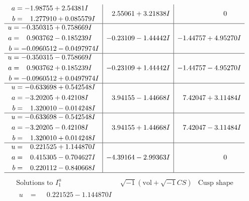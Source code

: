 \documentclass[1p]{elsarticle_modified}
\theoremstyle{definition}
\newcommand{\I}{\sqrt{-1}}
\begin{document}
$$\begin{array}{c|c|c}
\begin{aligned}
a &= -1.98755 + 2.54381 I \\
b &= \phantom{-}1.277910 + 0.085579 I\end{aligned}
 & \phantom{-}2.55061 + 3.21838 I & \phantom{-0.000000 } 0 \\ \hline\begin{aligned}
u &= -0.350315 + 0.758669 I \\
a &= \phantom{-}0.903762 - 0.185239 I \\
b &= -0.0960512 - 0.0497974 I\end{aligned}
 & -0.23109 - 1.44442 I & -1.44757 + 4.95270 I \\ \hline\begin{aligned}
u &= -0.350315 - 0.758669 I \\
a &= \phantom{-}0.903762 + 0.185239 I \\
b &= -0.0960512 + 0.0497974 I\end{aligned}
 & -0.23109 + 1.44442 I & -1.44757 - 4.95270 I \\ \hline\begin{aligned}
u &= -0.633698 + 0.542548 I \\
a &= -3.20205 + 0.42108 I \\
b &= \phantom{-}1.320010 - 0.014248 I\end{aligned}
 & \phantom{-}3.94155 - 1.44668 I & \phantom{-}7.42047 + 3.11484 I \\ \hline\begin{aligned}
u &= -0.633698 - 0.542548 I \\
a &= -3.20205 - 0.42108 I \\
b &= \phantom{-}1.320010 + 0.014248 I\end{aligned}
 & \phantom{-}3.94155 + 1.44668 I & \phantom{-}7.42047 - 3.11484 I \\ \hline\begin{aligned}
u &= \phantom{-}0.221525 + 1.144870 I \\
a &= \phantom{-}0.415305 - 0.704627 I \\
b &= \phantom{-}0.220112 - 0.840668 I\end{aligned}
 & -4.39164 - 2.99363 I & \phantom{-0.000000 } 0\\
 \hline 
 \end{array}$$\newpage$$\begin{array}{c|c|c}  
\text{Solutions to }I^u_{1}& \I (\text{vol} + \sqrt{-1}CS) & \text{Cusp shape}\\
 \hline 
\begin{aligned}
u &= \phantom{-}0.221525 - 1.144870 I \\

\end{aligned}
\end{array}$$
\end{document}
